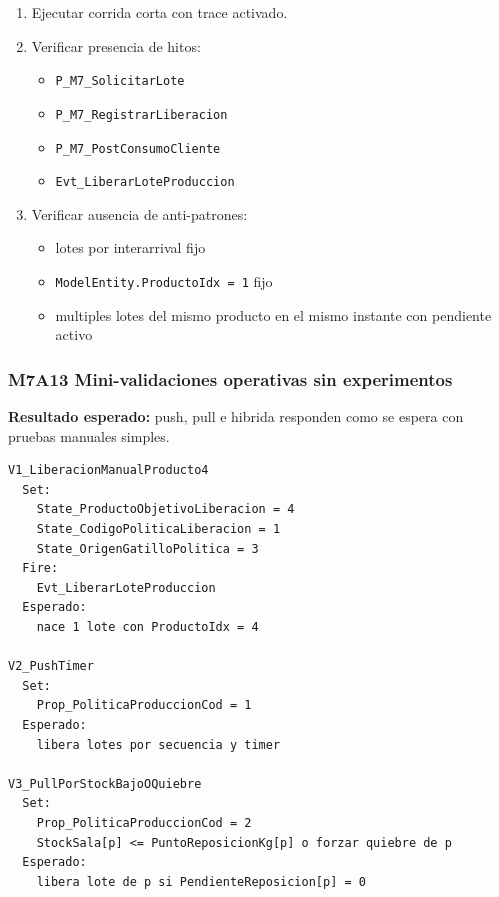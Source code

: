 \documentclass[11pt]{article}
\newcommand{\simio}[1]{\texttt{#1}}
\newcommand{\state}[1]{\texttt{#1}}
\begin{document}
\begin{enumerate}
  \item Ejecutar corrida corta con trace activado.
  \item Verificar presencia de hitos:
  \begin{itemize}
    \item \simio{P\_M7\_SolicitarLote}
    \item \simio{P\_M7\_RegistrarLiberacion}
    \item \simio{P\_M7\_PostConsumoCliente}
    \item \simio{Evt\_LiberarLoteProduccion}
  \end{itemize}
  \item Verificar ausencia de anti-patrones:
  \begin{itemize}
    \item lotes por interarrival fijo
    \item \state{ModelEntity.ProductoIdx = 1} fijo
    \item multiples lotes del mismo producto en el mismo instante con pendiente activo
  \end{itemize}
\end{enumerate}

\subsubsection{M7A13 Mini-validaciones operativas sin experimentos}
\textbf{Resultado esperado:} push, pull e hibrida responden como se espera con pruebas manuales simples.

\begin{lstlisting}[caption={Pruebas manuales obligatorias de M7A antes de M8}]
V1_LiberacionManualProducto4
  Set:
    State_ProductoObjetivoLiberacion = 4
    State_CodigoPoliticaLiberacion = 1
    State_OrigenGatilloPolitica = 3
  Fire:
    Evt_LiberarLoteProduccion
  Esperado:
    nace 1 lote con ProductoIdx = 4

V2_PushTimer
  Set:
    Prop_PoliticaProduccionCod = 1
  Esperado:
    libera lotes por secuencia y timer

V3_PullPorStockBajoOQuiebre
  Set:
    Prop_PoliticaProduccionCod = 2
    StockSala[p] <= PuntoReposicionKg[p] o forzar quiebre de p
  Esperado:
    libera lote de p si PendienteReposicion[p] = 0
\end{lstlisting}
\end{document}
